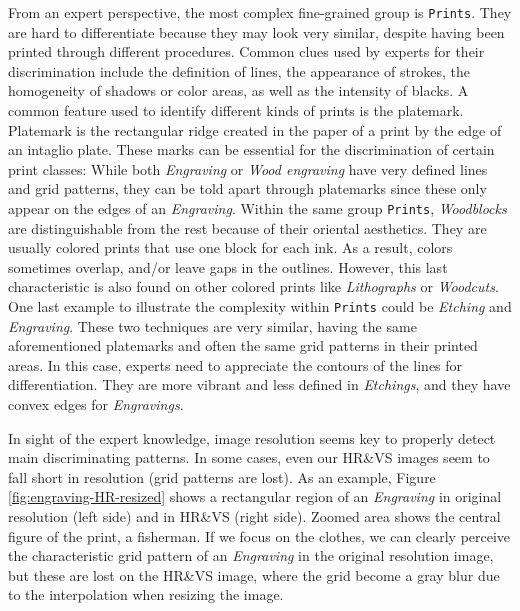 \documentclass{article}
\begin{document}
From an expert perspective, the most complex fine-grained group is \texttt{Prints}. They are hard to differentiate because they may look very similar, despite having been printed through different procedures. Common clues used by experts for their discrimination include the definition of lines, the appearance of strokes, the homogeneity of shadows or color areas, as well as the intensity of blacks. A common feature used to identify different kinds of prints is the platemark. Platemark is the rectangular ridge created in the paper of a print by the edge of an intaglio plate. These marks can be essential for the discrimination of certain print classes: While both \textit{Engraving} or \textit{Wood engraving} have very defined lines and grid patterns, they can be told apart through platemarks since these only appear on the edges of an \textit{Engraving}. Within the same group \texttt{Prints}, \textit{Woodblocks} are distinguishable from the rest because of their oriental aesthetics. They are usually colored prints that use one block for each ink. As a result, colors sometimes overlap, and/or leave gaps in the outlines. However, this last characteristic is also found on other colored prints like \textit{Lithographs} or \textit{Woodcuts}. One last example to illustrate the complexity within \texttt{Prints} could be \textit{Etching} and \textit{Engraving}. These two techniques are very similar, having the same aforementioned platemarks and often the same grid patterns in their printed areas. In this case, experts need to appreciate the contours of the lines for differentiation. They are more vibrant and less defined in \textit{Etchings}, and they have convex edges for \textit{Engravings}.

In sight of the expert knowledge, image resolution seems key to properly detect main discriminating patterns. In some cases, even our HR\&VS images seem to fall short in resolution (\eg grid patterns are lost). As an example, Figure \ref{fig:engraving-HR-resized} shows a rectangular region of an \textit{Engraving} in original resolution (left side) and in HR\&VS (right side). Zoomed area shows the central figure of the print, a fisherman. If we focus on the clothes, we can clearly perceive the characteristic grid pattern of an \textit{Engraving} in the original resolution image, but these are lost on the HR\&VS image, where the grid become a gray blur due to the interpolation when resizing the image.
\end{document}
